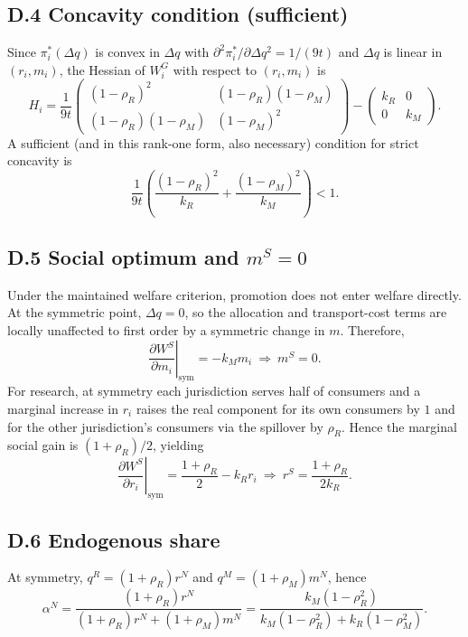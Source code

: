 \subsection*{D.4 Concavity condition (sufficient)}
Since $\pi_i^*(\Delta q)$ is convex in $\Delta q$ with $\partial^2 \pi_i^*/\partial \Delta q^2=1/(9t)$ and $\Delta q$ is linear in $(r_i,m_i)$, the Hessian of $W_i^G$ with respect to $(r_i,m_i)$ is
\[
H_i=\frac{1}{9t}
\begin{pmatrix}
(1-\rho_R)^2 & (1-\rho_R)(1-\rho_M)\\
(1-\rho_R)(1-\rho_M) & (1-\rho_M)^2
\end{pmatrix}
-
\begin{pmatrix}
k_R & 0\\
0 & k_M
\end{pmatrix}.
\]
A sufficient (and in this rank-one form, also necessary) condition for strict concavity is
\[
\frac{1}{9t}\left(\frac{(1-\rho_R)^2}{k_R}+\frac{(1-\rho_M)^2}{k_M}\right)<1.
\]

\subsection*{D.5 Social optimum and $m^S=0$}
Under the maintained welfare criterion, promotion does not enter welfare directly. At the symmetric point, $\Delta q=0$, so the allocation and transport-cost terms are locally unaffected to first order by a symmetric change in $m$. Therefore,
\[
\left.\frac{\partial W^S}{\partial m_i}\right|_{\text{sym}}=-k_M m_i \ \Rightarrow\ m^S=0.
\]
For research, at symmetry each jurisdiction serves half of consumers and a marginal increase in $r_i$ raises the real component for its own consumers by $1$ and for the other jurisdiction's consumers via the spillover by $\rho_R$. Hence the marginal social gain is $(1+\rho_R)/2$, yielding
\[
\left.\frac{\partial W^S}{\partial r_i}\right|_{\text{sym}}=\frac{1+\rho_R}{2}-k_R r_i \ \Rightarrow\ r^S=\frac{1+\rho_R}{2k_R}.
\]

\subsection*{D.6 Endogenous share}
At symmetry, $q^R=(1+\rho_R)r^N$ and $q^M=(1+\rho_M)m^N$, hence
\[
\alpha^N=\frac{(1+\rho_R)r^N}{(1+\rho_R)r^N+(1+\rho_M)m^N}
=\frac{k_M(1-\rho_R^2)}{k_M(1-\rho_R^2)+k_R(1-\rho_M^2)}.
\]

